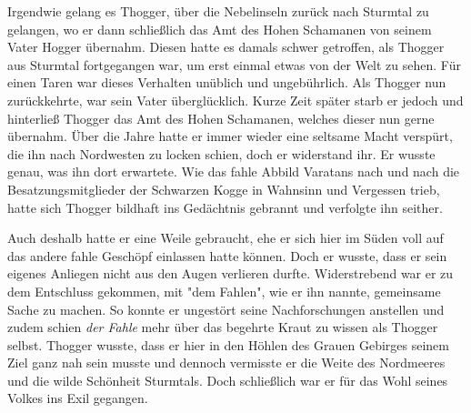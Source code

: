 \documentclass[10pt, a4paper, oneside]{book}
\begin{document}
\begin{multicols}{2}
Irgendwie gelang es Thogger, über die Nebelinseln zurück nach Sturmtal zu gelangen, wo er dann schließlich das Amt des Hohen Schamanen von seinem Vater Hogger übernahm. Diesen hatte es damals schwer getroffen, als Thogger aus Sturmtal fortgegangen war, um erst einmal etwas von der Welt zu sehen. Für einen Taren war dieses Verhalten unüblich und ungebührlich. Als Thogger nun zurückkehrte, war sein Vater überglücklich. Kurze Zeit später starb er jedoch und hinterließ Thogger das Amt des Hohen Schamanen, welches dieser nun gerne übernahm. Über die Jahre hatte er immer wieder eine seltsame Macht verspürt, die ihn nach Nordwesten zu locken schien, doch er widerstand ihr. Er wusste genau, was ihn dort erwartete. Wie das fahle Abbild Varatans nach und nach die Besatzungsmitglieder der Schwarzen Kogge in Wahnsinn und Vergessen trieb, hatte sich Thogger bildhaft ins Gedächtnis gebrannt und verfolgte ihn seither.\bigskip

Auch deshalb hatte er eine Weile gebraucht, ehe er sich hier im Süden voll auf das andere fahle Geschöpf einlassen hatte können. Doch er wusste, dass er sein eigenes Anliegen nicht aus den Augen verlieren durfte. Widerstrebend war er zu dem Entschluss gekommen, mit "dem Fahlen", wie er ihn nannte, gemeinsame Sache zu machen. So konnte er ungestört seine Nachforschungen anstellen und zudem schien \textit{der Fahle} mehr über das begehrte Kraut zu wissen als Thogger selbst. Thogger wusste, dass er hier in den Höhlen des Grauen Gebirges seinem Ziel ganz nah sein musste und dennoch vermisste er die Weite des Nordmeeres und die wilde Schönheit Sturmtals. Doch schließlich war er für das Wohl seines Volkes ins Exil gegangen.\bigskip


\end{multicols}
\end{document}
